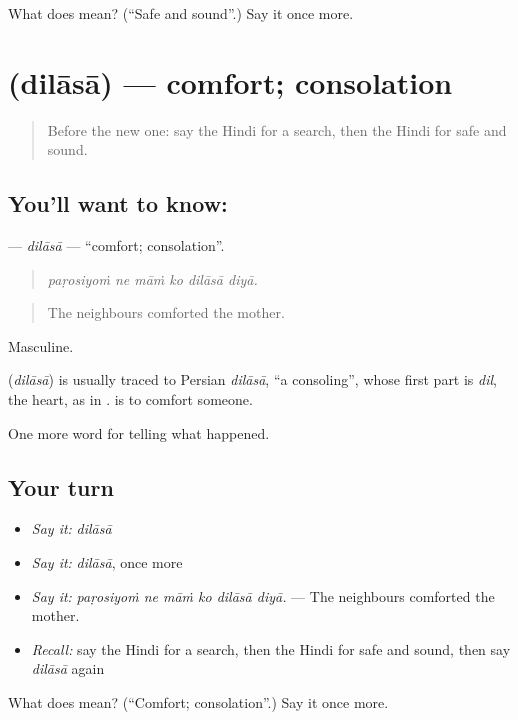 \begin{tcolorbox}[breakable,colback=teal!4,colframe=teal!35!black,title={Before you move on}]
What does  mean? (\textquotedblleft{}Safe and sound\textquotedblright{}.) Say it once more.
\end{tcolorbox}
\section[\texorpdfstring{\hi{दिलासा} (dilāsā)}{दिलासा (dilāsā)}]{ (dilāsā) — comfort; consolation}

\label{lesson:HI-C310-dilasa}



\begin{quote}
Before the new one: say the Hindi for a search, then the Hindi for safe and sound.
\end{quote}

\subsection*{You'll want to know: }
\textbf{} — \emph{dilāsā} — \textquotedblleft{}comfort; consolation\textquotedblright{}.

\begin{quote}
     
\end{quote}

\begin{quote}
\emph{paṛosiyoṁ ne māṁ ko dilāsā diyā.}
\end{quote}

\begin{quote}
The neighbours comforted the mother.
\end{quote}

Masculine.

\begin{cousinweb}
\textbf{} (\emph{dilāsā}) is usually traced to Persian \emph{dilāsā}, \textquotedblleft{}a consoling\textquotedblright{}, whose first part is \emph{dil}, the heart, as in \textbf{}. \textbf{ } is to comfort someone.
\end{cousinweb}

\begin{grammarlens}[title={What you've built}]
One more word for telling what happened.
\end{grammarlens}

\subsection*{Your turn}
\begin{itemize}
\raggedright
  \item \emph{Say it:} \emph{dilāsā}
  \item \emph{Say it:} \emph{dilāsā}, once more
  \item \emph{Say it:} \emph{paṛosiyoṁ ne māṁ ko dilāsā diyā.} — The neighbours comforted the mother.
  \item \emph{Recall:} say the Hindi for a search, then the Hindi for safe and sound, then say \emph{dilāsā} again
\end{itemize}

\begin{tcolorbox}[breakable,colback=teal!4,colframe=teal!35!black,title={Before you move on}]
What does  mean? (\textquotedblleft{}Comfort; consolation\textquotedblright{}.) Say it once more.
\end{tcolorbox}
